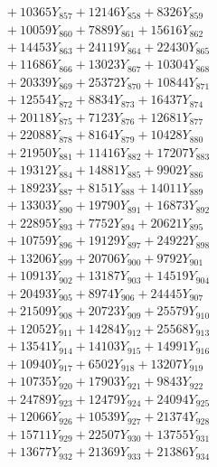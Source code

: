 \documentclass[a4paper,10pt]{article}
\begin{document}
{\begin{align}
&\;  + 10365 Y_{857} + 12146 Y_{858} + 8326 Y_{859} \\[0.3ex]
&\;  + 10059 Y_{860} + 7889 Y_{861} + 15616 Y_{862} \\[0.3ex]
&\;  + 14453 Y_{863} + 24119 Y_{864} + 22430 Y_{865} \\[0.3ex]
&\;  + 11686 Y_{866} + 13023 Y_{867} + 10304 Y_{868} \\[0.5ex]\allowbreak
&\;  + 20339 Y_{869} + 25372 Y_{870} + 10844 Y_{871} \\[0.3ex]
&\;  + 12554 Y_{872} + 8834 Y_{873} + 16437 Y_{874} \\[0.3ex]
&\;  + 20118 Y_{875} + 7123 Y_{876} + 12681 Y_{877} \\[0.3ex]
&\;  + 22088 Y_{878} + 8164 Y_{879} + 10428 Y_{880} \\[0.3ex]
&\;  + 21950 Y_{881} + 11416 Y_{882} + 17207 Y_{883} \\[0.3ex]
&\;  + 19312 Y_{884} + 14881 Y_{885} + 9902 Y_{886} \\[0.3ex]
&\;  + 18923 Y_{887} + 8151 Y_{888} + 14011 Y_{889} \\[0.3ex]
&\;  + 13303 Y_{890} + 19790 Y_{891} + 16873 Y_{892} \\[0.3ex]
&\;  + 22895 Y_{893} + 7752 Y_{894} + 20621 Y_{895} \\[0.3ex]
&\;  + 10759 Y_{896} + 19129 Y_{897} + 24922 Y_{898} \\[0.5ex]\allowbreak
&\;  + 13206 Y_{899} + 20706 Y_{900} + 9792 Y_{901} \\[0.3ex]
&\;  + 10913 Y_{902} + 13187 Y_{903} + 14519 Y_{904} \\[0.3ex]
&\;  + 20493 Y_{905} + 8974 Y_{906} + 24445 Y_{907} \\[0.3ex]
&\;  + 21509 Y_{908} + 20723 Y_{909} + 25579 Y_{910} \\[0.3ex]
&\;  + 12052 Y_{911} + 14284 Y_{912} + 25568 Y_{913} \\[0.3ex]
&\;  + 13541 Y_{914} + 14103 Y_{915} + 14991 Y_{916} \\[0.3ex]
&\;  + 10940 Y_{917} + 6502 Y_{918} + 13207 Y_{919} \\[0.3ex]
&\;  + 10735 Y_{920} + 17903 Y_{921} + 9843 Y_{922} \\[0.3ex]
&\;  + 24789 Y_{923} + 12479 Y_{924} + 24094 Y_{925} \\[0.3ex]
&\;  + 12066 Y_{926} + 10539 Y_{927} + 21374 Y_{928} \\[0.5ex]\allowbreak
&\;  + 15711 Y_{929} + 22507 Y_{930} + 13755 Y_{931} \\[0.3ex]
&\;  + 13677 Y_{932} + 21369 Y_{933} + 21386 Y_{934} \\[0.3ex]

\end{align}}
\end{document}
